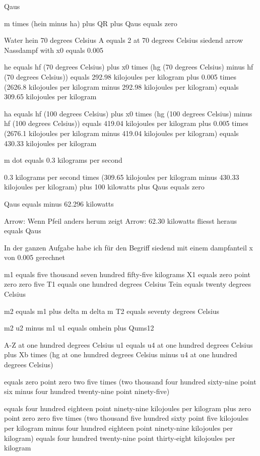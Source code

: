 Qaus

m times (hein minus ha) plus QR plus Qaus equals zero

Water  
hein 70 degrees Celsius  
A equals 2 at 70 degrees Celsius  
siedend arrow Nassdampf  
with x0 equals 0.005

he equals hf (70 degrees Celsius) plus x0 times (hg (70 degrees Celsius) minus hf (70 degrees Celsius))  
equals 292.98 kilojoules per kilogram plus 0.005 times (2626.8 kilojoules per kilogram minus 292.98 kilojoules per kilogram)  
equals 309.65 kilojoules per kilogram

ha equals hf (100 degrees Celsius) plus x0 times (hg (100 degrees Celsius) minus hf (100 degrees Celsius))  
equals 419.04 kilojoules per kilogram plus 0.005 times (2676.1 kilojoules per kilogram minus 419.04 kilojoules per kilogram)  
equals 430.33 kilojoules per kilogram

m dot equals 0.3 kilograms per second

0.3 kilograms per second times (309.65 kilojoules per kilogram minus 430.33 kilojoules per kilogram) plus 100 kilowatts plus Qaus equals zero

Qaus equals minus 62.296 kilowatts

Arrow: Wenn Pfeil anders herum zeigt  
Arrow: 62.30 kilowatts fliesst heraus  
equals Qaus

In der ganzen Aufgabe  
habe ich für den Begriff  
siedend mit einem dampfanteil  
x von 0.005 gerechnet

m1 equals five thousand seven hundred fifty-five kilograms  
X1 equals zero point zero zero five  
T1 equals one hundred degrees Celsius  
Tein equals twenty degrees Celsius  

m2 equals m1 plus delta m  
delta m  
T2 equals seventy degrees Celsius  

m2 u2 minus m1 u1 equals omhein plus Qums12  

A-Z at one hundred degrees Celsius  
u1 equals u4 at one hundred degrees Celsius plus Xb times (hg at one hundred degrees Celsius minus u4 at one hundred degrees Celsius)  

equals zero point zero two five times (two thousand four hundred sixty-nine point six minus four hundred twenty-nine point ninety-five)  

equals four hundred eighteen point ninety-nine kilojoules per kilogram plus zero point zero zero five times (two thousand five hundred sixty point five kilojoules per kilogram minus four hundred eighteen point ninety-nine kilojoules per kilogram)  
equals four hundred twenty-nine point thirty-eight kilojoules per kilogram  


